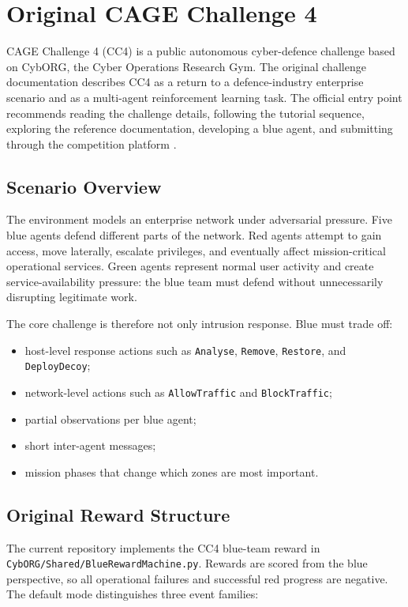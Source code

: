\section{Original CAGE Challenge 4}

CAGE Challenge 4 (CC4) is a public autonomous cyber-defence challenge based on CybORG, the Cyber Operations Research Gym. The original challenge documentation describes CC4 as a return to a defence-industry enterprise scenario and as a multi-agent reinforcement learning task. The official entry point recommends reading the challenge details, following the tutorial sequence, exploring the reference documentation, developing a blue agent, and submitting through the competition platform \cite{cc4_home,cc4_details,cc4_tutorials}.

\subsection{Scenario Overview}

The environment models an enterprise network under adversarial pressure. Five blue agents defend different parts of the network. Red agents attempt to gain access, move laterally, escalate privileges, and eventually affect mission-critical operational services. Green agents represent normal user activity and create service-availability pressure: the blue team must defend without unnecessarily disrupting legitimate work.

The core challenge is therefore not only intrusion response. Blue must trade off:
\begin{itemize}
  \item host-level response actions such as \texttt{Analyse}, \texttt{Remove}, \texttt{Restore}, and \texttt{DeployDecoy};
  \item network-level actions such as \texttt{AllowTraffic} and \texttt{BlockTraffic};
  \item partial observations per blue agent;
  \item short inter-agent messages;
  \item mission phases that change which zones are most important.
\end{itemize}

\subsection{Original Reward Structure}

The current repository implements the CC4 blue-team reward in
\texttt{CybORG/Shared/BlueRewardMachine.py}. Rewards are scored from the
blue perspective, so all operational failures and successful red progress are
negative. The default mode distinguishes three event families:

